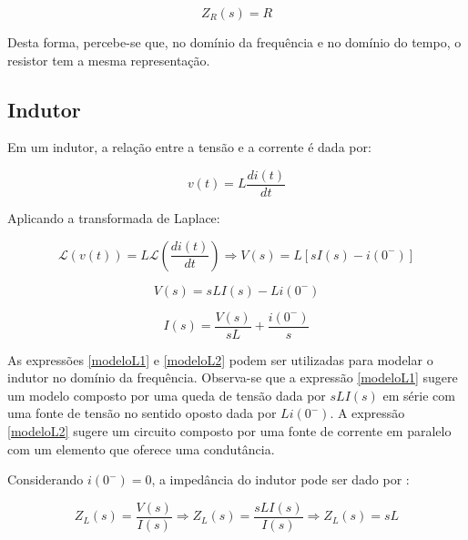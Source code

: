 \documentclass[12pt,fleqn]{book} %
\begin{document}
    \begin{equation}
     Z_R(s) = R
    \end{equation}
    
Desta forma, percebe-se que, no domínio da frequência e no domínio do tempo, o resistor tem a mesma representação.     
        
        \subsection{Indutor}
        
        Em um indutor, a relação entre a tensão e a corrente é dada por:
        
        \begin{equation}\label{indutors}
        v(t) = L\frac{di(t)}{dt}
        \end{equation}
        
        Aplicando a transformada de Laplace:
        
        \begin{equation}
        \mathscr{L}(v(t)) = L\mathscr{L}(\frac{di(t)}{dt})\Rightarrow V(s) = L[sI(s)-i(0^-)] 
        \end{equation}
        
        \begin{equation}\label{modeloL1}
        V(s) = sLI(s)-Li(0^-)
        \end{equation}
        
        \begin{equation}\label{modeloL2}
        I(s) = \frac{V(s)}{sL} + \frac{i(0^-)}{s} 
        \end{equation}
        
        As expressões \ref{modeloL1} e \ref{modeloL2} podem ser utilizadas para modelar o indutor no domínio da frequência. Observa-se que a expressão \ref{modeloL1} sugere um modelo composto por uma queda de tensão dada por $sLI(s)$ em série com uma fonte de tensão no sentido oposto dada por $Li(0^-)$. A expressão \ref{modeloL2} sugere um circuito composto por uma fonte de corrente em paralelo com um elemento que oferece uma condutância.
        
        Considerando $i(0^-) = 0$, a impedância do indutor pode ser dado por :
        
        \begin{equation}
        Z_L(s) = \frac{V(s)}{I(s)}\Rightarrow Z_L(s) = \frac{sLI(s)}{I(s)}\Rightarrow Z_L(s) = sL
        \end{equation}
        
\end{document}
